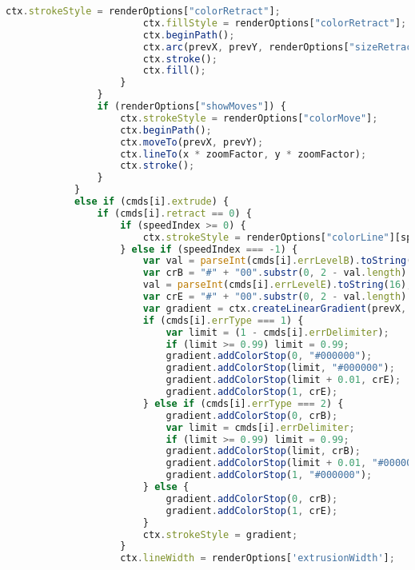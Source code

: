 \begin{lstlisting}[language=JavaScript, label={lst:renderFactory}, caption=When render frames are requested this file compiles the lines of gcode from the worker and sets up the rest of the canvas frames.]
                        ctx.strokeStyle = renderOptions["colorRetract"];
                        ctx.fillStyle = renderOptions["colorRetract"];
                        ctx.beginPath();
                        ctx.arc(prevX, prevY, renderOptions["sizeRetractSpot"], 0, Math.PI * 2, true);
                        ctx.stroke();
                        ctx.fill();
                    }
                }
                if (renderOptions["showMoves"]) {
                    ctx.strokeStyle = renderOptions["colorMove"];
                    ctx.beginPath();
                    ctx.moveTo(prevX, prevY);
                    ctx.lineTo(x * zoomFactor, y * zoomFactor);
                    ctx.stroke();
                }
            }
            else if (cmds[i].extrude) {
                if (cmds[i].retract == 0) {
                    if (speedIndex >= 0) {
                        ctx.strokeStyle = renderOptions["colorLine"][speedIndex];
                    } else if (speedIndex === -1) {
                        var val = parseInt(cmds[i].errLevelB).toString(16);
                        var crB = "#" + "00".substr(0, 2 - val.length) + val + '0000';
                        val = parseInt(cmds[i].errLevelE).toString(16);
                        var crE = "#" + "00".substr(0, 2 - val.length) + val + '0000';
                        var gradient = ctx.createLinearGradient(prevX, prevY, x * zoomFactor, y * zoomFactor);
                        if (cmds[i].errType === 1) {
                            var limit = (1 - cmds[i].errDelimiter);
                            if (limit >= 0.99) limit = 0.99;
                            gradient.addColorStop(0, "#000000");
                            gradient.addColorStop(limit, "#000000");
                            gradient.addColorStop(limit + 0.01, crE);
                            gradient.addColorStop(1, crE);
                        } else if (cmds[i].errType === 2) {
                            gradient.addColorStop(0, crB);
                            var limit = cmds[i].errDelimiter;
                            if (limit >= 0.99) limit = 0.99;
                            gradient.addColorStop(limit, crB);
                            gradient.addColorStop(limit + 0.01, "#000000");
                            gradient.addColorStop(1, "#000000");
                        } else {
                            gradient.addColorStop(0, crB);
                            gradient.addColorStop(1, crE);
                        }
                        ctx.strokeStyle = gradient;
                    }
                    ctx.lineWidth = renderOptions['extrusionWidth'];

\end{lstlisting}
